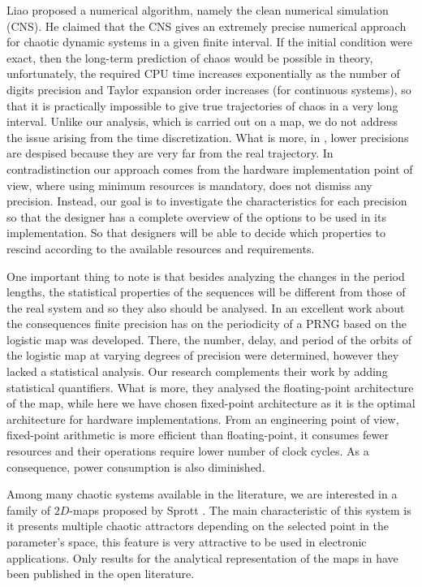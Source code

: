 Liao \cite{Liao2013b,Liao2012,Liao2009} proposed a numerical algorithm, namely the clean numerical simulation (CNS).
He claimed that the CNS gives an extremely precise numerical approach for chaotic dynamic systems in a given finite interval. If the initial condition were exact, then the long-term prediction of chaos would be possible in theory, unfortunately, the required CPU time increases exponentially as the number of digits precision and Taylor expansion order increases (for continuous systems), so that it is practically impossible to give true trajectories of chaos in a very long interval. Unlike our analysis, which is carried out on a map, we do not address the issue arising from the time discretization.
What is more, in \cite{Liao2009}, lower precisions are despised because they are very far from the real trajectory. In contradistinction our approach comes from the hardware implementation point of view, where using minimum resources is mandatory, does not dismiss any precision. Instead, our goal is to investigate the characteristics for each precision so that the designer has a complete overview of the options to be used in its implementation. So that designers will be able to decide which properties to rescind according to the available resources and requirements.

One important thing to note is that besides analyzing the changes in the period lengths, the statistical properties of the sequences will be different from those of the real system and so they also should be analysed. In \cite{Persohn2012} an excellent work about the consequences finite precision has on the periodicity of a PRNG based
on the logistic map was developed. There, the number, delay, and period of the orbits of the logistic map at varying degrees of precision were determined, however they lacked a statistical analysis. Our research complements their work by adding statistical quantifiers. What is more, they analysed the floating-point architecture of the map, while here we have chosen fixed-point architecture as it is the optimal architecture for hardware implementations. From an engineering point of view, fixed-point arithmetic is more efficient than floating-point, it consumes fewer resources and their operations require lower number of clock cycles. As a consequence, power consumption is also diminished.

Among many chaotic systems available in the literature, we are interested in a family of $2D$-maps proposed by Sprott \cite{Sprott1993}. 
The main characteristic of this system is it presents multiple chaotic attractors depending on the selected
point in the parameter's space, this feature is very attractive to be used in electronic applications.
Only results for the analytical representation of the
maps in \cite{Sprott1993} have been published in the open literature.

